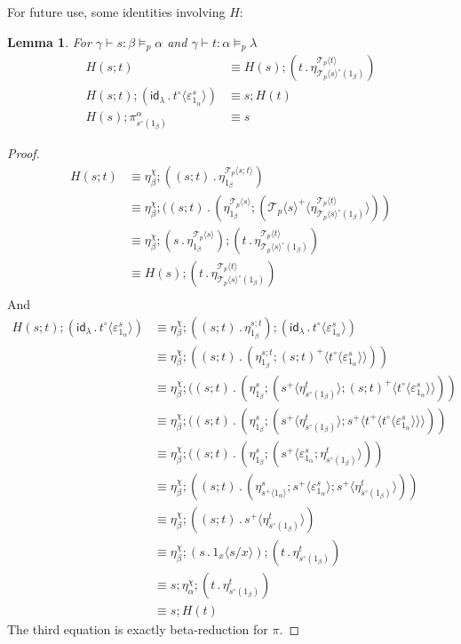 \documentclass[10pt]{article}
\newtheorem{lemma}{Lemma}
\theoremstyle{definition}
\newcommand{\yields}{\vdash}
\newcommand\TrCirc[2]{\ensuremath{{#1}^\circ(#2)}}
\newcommand{\id}{\mathsf{id}}
\newcommand\ApEl[2]{\mathcal{T}_{#1}\langle#2\rangle}
\newcommand\ap[2]{\ensuremath{#1 \langle #2 \rangle }}
\newcommand\bdot[0]{\mathbin{.}}
\begin{document}
For future use, some identities involving $H$:

\begin{lemma}\label{lemma:h-on-composite}
For $\gamma \yields s : \beta \vDash_p \alpha$ and $\gamma \yields t : \alpha \vDash_p \lambda$
\begin{align*}
H(s;t) &\equiv H(s) ; (t \bdot \eta^{\ApEl{p}{t}}_{\TrCirc{\ApEl{p}{s}}{1_\beta}}) \\
H(s ; t) ; (\id_\lambda \bdot \ap{t^\circ}{\varepsilon^{s}_{1_{\alpha}}}) &\equiv s ; H(t) \\
H(s) ; \pi^\alpha_{\TrCirc{s}{1_\beta}} &\equiv s
\end{align*}
\end{lemma}
\begin{proof}
\begin{align*}
H(s;t)
&\equiv \eta^\chi_\beta ; ((s;t) \bdot \eta^{\ApEl{p}{s;t}}_{1_\beta}) \\
&\equiv \eta^\chi_\beta ; ((s;t) \bdot (\eta^{\ApEl{p}{s}}_{1_\beta} ; (\ap{\ApEl{p}{s}^+}{\eta^{\ApEl{p}{t}}_{\TrCirc{\ApEl{p}{s}}{1_\beta}}})) \\
&\equiv \eta^\chi_\beta ; (s \bdot \eta^{\ApEl{p}{s}}_{1_\beta}) ; (t \bdot \eta^{\ApEl{p}{t}}_{\TrCirc{\ApEl{p}{s}}{1_\beta}}) \\
&\equiv H(s) ; (t \bdot \eta^{\ApEl{p}{t}}_{\TrCirc{\ApEl{p}{s}}{1_\beta}}) \\
\end{align*}
And
\begin{align*}
H(s ; t) ; (\id_\lambda \bdot \ap{t^\circ}{\varepsilon^{s}_{1_{\alpha}}})
&\equiv \eta^\chi_\beta ; ((s;t) \bdot \eta^{s;t}_{1_\beta}) ; (\id_\lambda \bdot \ap{t^\circ}{\varepsilon^{s}_{1_{\alpha}}}) \\
&\equiv \eta^\chi_\beta ; ((s;t) \bdot (\eta^{s;t}_{1_\beta} ; \ap{(s;t)^+}{\ap{t^\circ}{\varepsilon^{s}_{1_{\alpha}}}})) \\
&\equiv \eta^\chi_\beta ; ((s;t) \bdot (\eta^s_{1_\beta} ; (\ap{s^+}{\eta^{t}_{\TrCirc{s}{1_\beta}}} ; \ap{(s;t)^+}{\ap{t^\circ}{\varepsilon^{s}_{1_{\alpha}}}})) \\
&\equiv \eta^\chi_\beta ; ((s;t) \bdot (\eta^s_{1_\beta} ; (\ap{s^+}{\eta^{t}_{\TrCirc{s}{1_\beta}}} ; \ap{s^+}{\ap{t^+}{\ap{t^\circ}{\varepsilon^{s}_{1_{\alpha}}}}})) \\
&\equiv \eta^\chi_\beta ; ((s;t) \bdot (\eta^s_{1_\beta} ; (\ap{s^+}{\varepsilon^{s}_{1_{\alpha}} ; \eta^{t}_{\TrCirc{s}{1_\beta}}} )) \\
&\equiv \eta^\chi_\beta ; ((s;t) \bdot (\eta^s_{\ap{s^+}{1_\alpha}} ; \ap{s^+}{\varepsilon^{s}_{1_{\alpha}}} ; \ap{s^+}{\eta^{t}_{\TrCirc{s}{1_\beta}}} )) \\
&\equiv \eta^\chi_\beta ; ((s;t) \bdot \ap{s^+}{\eta^{t}_{\TrCirc{s}{1_\beta}}}) \\
&\equiv \eta^\chi_\beta ; (s \bdot \ap{1_x}{s/x}) ; (t \bdot \eta^{t}_{\TrCirc{s}{1_\beta}}) \\
&\equiv s ; \eta^\chi_\alpha ; (t \bdot \eta^{t}_{\TrCirc{s}{1_\beta}}) \\
&\equiv s ; H(t)
\end{align*}
The third equation is exactly beta-reduction for $\pi$.
\end{proof}
\end{document}
